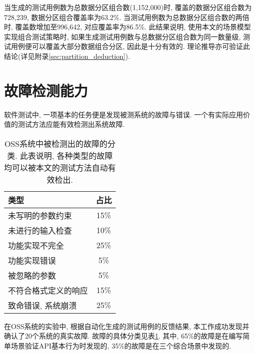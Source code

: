             当生成的测试用例数为总数据分区组合数(1,152,000)时, 覆盖的数据分区组合数为728,239, 数据分区组合覆盖率为63.2\%. 当测试用例数为总数据分区组合数的两倍时, 覆盖数增加至996,642, 对应覆盖率为86.5\%. 此结果说明, 使用本文的场景模型实现组合测试策略时, 如果生成测试用例数与总数据分区组合数为同一数量级, 测试用例便可以覆盖大部分数据组合分区, 因此是十分有效的. 理论推导亦可验证此结论(详见附录\ref{sec:partition_deduction}).
    
    \section{故障检测能力}
    
        软件测试中, 一项基本的任务便是发现被测系统的故障与错误. 一个有实际应用价值的测试方法应能有效检测出系统故障.
        
        \begin{table}[!htb]
            \centering
            \begin{tabular}{lc}
                \toprule
                类型 & 占比 \\
                \midrule
                未写明的参数约束 & 15\% \\
                未进行的输入检查 & 10\% \\
                功能实现不完全 & 25\% \\
                功能实现错误 & 5\% \\
                被忽略的参数 & 5\% \\
                不符合格式定义的响应 & 15\% \\
                致命错误, 系统崩溃 & 25\% \\
                \bottomrule
            \end{tabular}
            \caption{OSS系统中被检测出的故障的分类. 此表说明, 各种类型的故障均可以被本文的测试方法自动有效检出.}
            \label{tab:oss_bug_classification}
        \end{table}
        
        在OSS系统的实验中, 根据自动化生成的测试用例的反馈结果, 本工作成功发现并确认了20个系统的真实故障. 故障的具体分类见表\ref{tab:oss_bug_classification}. 其中, 65\%的故障是在编写简单场景验证API基本行为时发现的, 35\%的故障是在三个综合场景中发现的.
        
